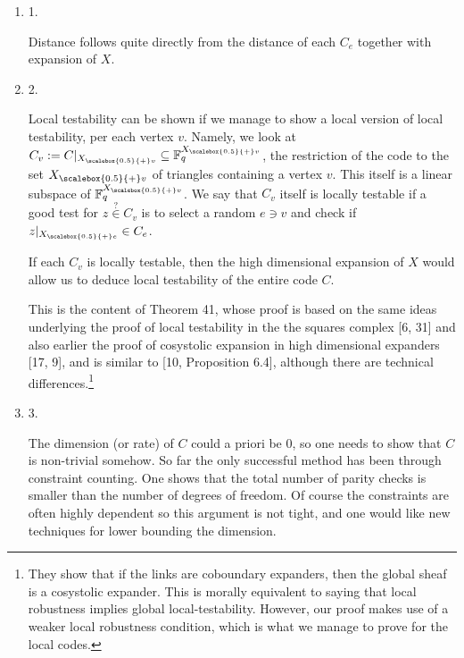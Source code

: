 \begin{enumerate}


\item[] 
1. 


Distance follows quite directly from the distance of each $C_{e}$ together with expansion of $X$.\par





\item[] 
2. 


Local testability can be shown if we manage to show a local version of local testability, per each vertex $v$. Namely, we look at $C_{v}:=C|_{{X}_{\scalebox{0.5}{+}v}}\subseteq\mathbb{F}_{q}^{{X}_{\scalebox{0.5}{+}v}}$, the restriction of the code to the set ${X}_{\scalebox{0.5}{+}v}$ of triangles containing a vertex $v$. This itself is a linear subspace of $\mathbb{F}_{q}^{{X}_{\scalebox{0.5}{+}v}}$. We say that $C_{v}$ itself is locally testable if a good test for $z\stackrel{{\scriptstyle?}}{{\in}}C_{v}$ is to select a random $e\ni v$ and check if $z|_{{X}_{\scalebox{0.5}{+}e}}\in C_{e}$.\par




If each $C_{v}$ is locally testable, then the high dimensional expansion of $X$ would allow us to deduce local testability of the entire code $C$.\par




This is the content of Theorem 41, whose proof is based on the same ideas underlying the proof of local testability in the the squares complex [6, 31] and also earlier the proof of cosystolic expansion in high dimensional expanders [17, 9], and is similar to [10, Proposition 6.4], although there are technical differences.\footnote{They show that if the links are coboundary expanders, then the global sheaf is a cosystolic expander. This is morally equivalent to saying that local robustness implies global local-testability. However, our proof makes use of a weaker local robustness condition, which is what we manage to prove for the local codes.}\par





\item[] 
3. 


The dimension (or rate) of $C$ could a priori be $0$, so one needs to show that $C$ is non-trivial somehow. So far the only successful method has been through constraint counting. One shows that the total number of parity checks is smaller than the number of degrees of freedom. Of course the constraints are often highly dependent so this argument is not tight, and one would like new techniques for lower bounding the dimension.\par





\end{enumerate}


